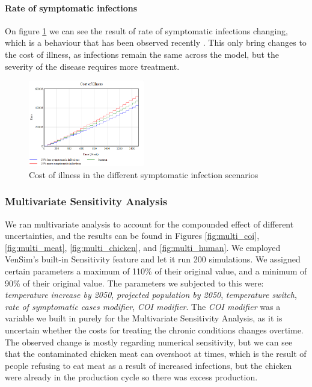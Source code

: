 \paragraph{Rate of symptomatic infections} %

On figure \ref{fig:symptom_COI} we can see the result of rate of symptomatic infections changing, which is a behaviour that has been observed recently \parencite{medema_assessment_1996}. This only bring changes to the cost of illness, as infections remain the same across the model, but the severity of the disease requires more treatment.

\begin{figure}[h!]
    \centering
    \includegraphics[width=0.45\textwidth]{images/sensitivity/Symptomatic COI.png} 
    \caption{Cost of illness in the different symptomatic infection scenarios}
    \label{fig:symptom_COI}
\end{figure}

\subsubsection{Multivariate Sensitivity Analysis}

We ran multivariate analysis to account for the compounded effect of different uncertainties, and the results can be found in Figures \ref{fig:multi_coi}, \ref{fig:multi_meat}, \ref{fig:multi_chicken}, and \ref{fig:multi_human}. We employed VenSim's built-in Sensitivity feature and let it run 200 simulations. We assigned certain parameters a maximum of 110\% of their original value, and a minimum of 90\% of their original value. The parameters we subjected to this were: \textit{temperature increase by 2050}, \textit{projected population by 2050}, \textit{temperature switch}, \textit{rate of symptomatic cases modifier}, \textit{COI modifier}. The \textit{COI modifier} was a variable we built in purely for the Multivariate Sensitivity Analysis, as it is uncertain whether the costs for treating the chronic conditions changes overtime. The observed change is mostly regarding numerical sensitivity, but we can see that the contaminated chicken meat can overshoot at times, which is the result of people refusing to eat meat as a result of increased infections, but the chicken were already in the production cycle so there was excess production.

